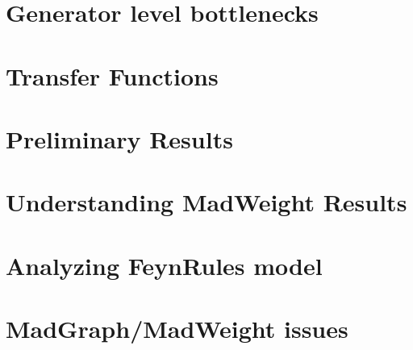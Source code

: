 \documentclass[a4paper,12pt]{book}
\begin{document}
\chapter{Generator level bottlenecks}


\chapter{Transfer Functions}


\chapter{Preliminary Results}


\chapter{Understanding MadWeight Results}


\chapter{Analyzing FeynRules model}


\chapter{MadGraph/MadWeight issues}

\end{document}
